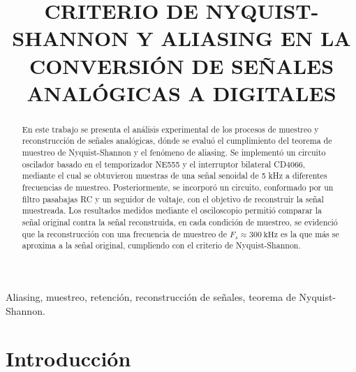 \documentclass[conference]{IEEEtran}
\begin{document}
\title{
CRITERIO DE NYQUIST-SHANNON Y ALIASING EN LA CONVERSIÓN DE SEÑALES ANALÓGICAS A DIGITALES
}


\author{

}

\maketitle



\begin{abstract}

En este trabajo se presenta el análisis experimental de los procesos de muestreo
y reconstrucción de señales analógicas, dónde se evaluó el cumplimiento 
del teorema de muestreo de Nyquist-Shannon y el fenómeno de aliasing. Se 
implementó un circuito oscilador basado en el temporizador NE555 y el interruptor 
bilateral CD4066, mediante el cual se obtuvieron muestras de una señal senoidal de 
5 kHz a diferentes frecuencias de muestreo. Posteriormente, se incorporó un circuito,
conformado por un filtro pasabajas RC y un seguidor de voltaje, 
con el objetivo de reconstruir la señal muestreada. Los resultados medidos mediante el
osciloscopio permitió comparar la señal original contra la señal reconstruida, en cada 
condición de muestreo, se evidenció que la reconstrucción con una frecuencia de muestreo de $F_s\approx\SI{300}{\kilo\hertz}$
es la que más se aproxima a la señal original, cumpliendo con el criterio de Nyquist-Shannon.

\end{abstract}


\begin{IEEEkeywords}

Aliasing, muestreo, retención, reconstrucción de señales, teorema de Nyquist-Shannon.

\end{IEEEkeywords}


\section{Introducción}
\end{document}

